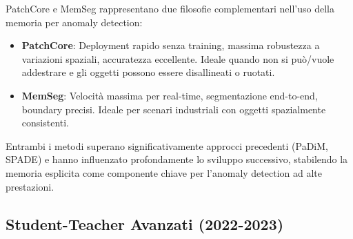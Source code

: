 PatchCore e MemSeg rappresentano due filosofie complementari nell'uso della memoria per anomaly detection:

\begin{table}[h]
\centering
\caption{Confronto tra approcci memory-based}
\end{table}



\begin{itemize}
\item \textbf{PatchCore}: Deployment rapido senza training, massima robustezza a variazioni spaziali, accuratezza eccellente. Ideale quando non si può/vuole addestrare e gli oggetti possono essere disallineati o ruotati.

\item \textbf{MemSeg}: Velocità massima per real-time, segmentazione end-to-end, boundary precisi. Ideale per scenari industriali con oggetti spazialmente consistenti.
\end{itemize}

Entrambi i metodi superano significativamente approcci precedenti (PaDiM, SPADE) e hanno influenzato profondamente lo sviluppo successivo, stabilendo la memoria esplicita come componente chiave per l'anomaly detection ad alte prestazioni.




\subsection{Student-Teacher Avanzati (2022-2023)}
\label{subsec:metodi-student-teacher-avanzati}

